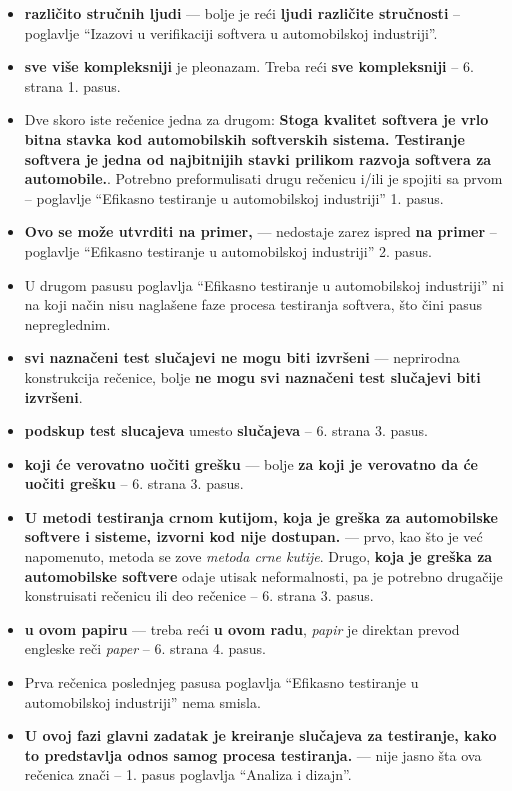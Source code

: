 \documentclass[a4paper]{report}
\begin{document}
\begin{itemize}
\item {\bf{različito stručnih ljudi}} --- bolje je reći {\bf{ljudi različite stručnosti}} -- poglavlje ``Izazovi u verifikaciji softvera u automobilskoj industriji''.
\item {\bf{sve više kompleksniji}} je pleonazam. Treba reći {\bf{sve kompleksniji}} -- 6. strana 1. pasus.
\item Dve skoro iste rečenice jedna za drugom: {\bf{Stoga kvalitet softvera je vrlo bitna stavka kod automobilskih softverskih sistema. Testiranje softvera je jedna od najbitnijih stavki prilikom razvoja softvera za automobile.}}. Potrebno preformulisati drugu rečenicu i/ili je spojiti sa prvom -- poglavlje ``Efikasno testiranje u automobilskoj industriji'' 1. pasus.
\item {\bf{Ovo se može utvrditi na primer,}} --- nedostaje zarez ispred {\bf{na primer}} -- poglavlje ``Efikasno testiranje u automobilskoj industriji'' 2. pasus.
\item U drugom pasusu poglavlja ``Efikasno testiranje u automobilskoj industriji'' ni na koji način nisu naglašene faze procesa testiranja softvera, što čini pasus nepreglednim.
\item {\bf{svi naznačeni test slučajevi ne mogu biti izvršeni}} --- neprirodna konstrukcija rečenice, bolje {\bf{ne mogu svi naznačeni test slučajevi biti izvršeni}}.
\item {\bf{podskup test slucajeva}} umesto {\bf{slučajeva}} -- 6. strana 3. pasus.
\item {\bf{koji će verovatno uočiti grešku}} --- bolje {\bf{za koji je verovatno da će uočiti grešku}} -- 6. strana 3. pasus.
\item {\bf{U metodi testiranja crnom kutijom, koja je greška za automobilske softvere i sisteme, izvorni kod nije dostupan.}} --- prvo, kao što je već napomenuto, metoda se zove {\em{metoda crne kutije}}. Drugo, {\bf{koja je greška za automobilske softvere}} odaje utisak neformalnosti, pa je potrebno drugačije konstruisati rečenicu ili deo rečenice -- 6. strana 3. pasus.
\item {\bf{u ovom papiru}} --- treba reći {\bf{u ovom radu}}, {\em{papir}} je direktan prevod engleske reči {\em{paper}} -- 6. strana 4. pasus.
\item Prva rečenica poslednjeg pasusa poglavlja ``Efikasno testiranje u automobilskoj industriji'' nema smisla.
\item {\bf{U ovoj fazi glavni zadatak je kreiranje slučajeva za testiranje, kako to predstavlja odnos samog procesa testiranja.}} --- nije jasno šta ova rečenica znači -- 1. pasus poglavlja ``Analiza i dizajn''.

\end{itemize}
\end{document}
